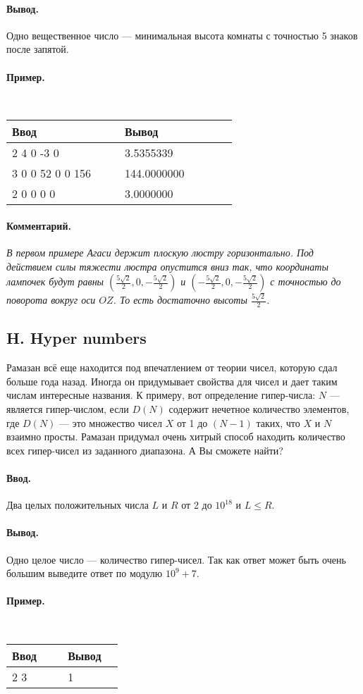 \documentclass[12pt, a4paper]{article}
\newcommand{\informat}[1]
{
	\paragraph{Ввод.\\} #1
}
\newcommand{\outformat}[1]
{
	\paragraph{Вывод.\\} #1
}
\newcommand{\example}[2]
{
	\paragraph{Пример.\\}
	{\tt
	\begin{tabular}{|p{0.4\linewidth}|p{0.4\linewidth}|}
	\hline
	Ввод & Вывод \\
	\hline
	#1 & #2		\\
	\hline
	\end{tabular}
	}
}
\newcommand{\exampleee}[6]
{
	\paragraph{Пример.\\}
	{\tt
	\begin{tabular}{|p{0.4\linewidth}|p{0.4\linewidth}|}
	\hline
	Ввод 	& Вывод  	\\
	\hline
	#1 		& #2 		\\
	\hline
	#3		& #4		\\
	\hline
	#5		& #6		\\
	\hline
	\end{tabular}
	}
}
\newcommand{\excomm}[1]
{
	\paragraph{Комментарий. \\}
	\textit{#1}
}
\begin{document}
\outformat{Одно вещественное число --- минимальная высота комнаты с точностью 5 знаков после запятой.}

\exampleee{
2 \newline
3 4 0 \newline
4 -3 0
}
{3.5355339}
{3 \newline
39 0 0 \newline
0 52 0 \newline
0 0 156
}
{144.0000000}
{2 \newline
1 0 0 \newline
-2 0 0
}
{3.0000000}

\excomm{В первом примере Агаси держит плоскую люстру горизонтально. Под действием силы тяжести люстра опустится вниз так, что координаты лампочек будут равны $\left(\frac{5 \sqrt{2}}{2}, 0, -\frac{5 \sqrt{2}}{2} \right)$ и $\left(-\frac{5 \sqrt{2}}{2}, 0, -\frac{5 \sqrt{2}}{2} \right)$ с точностью до поворота вокруг оси $OZ$. То есть достаточно высоты $\frac{5 \sqrt{2}}{2}$.}






\subsection*{H. Hyper numbers}
 

Рамазан всё еще находится под впечатлением от теории чисел, которую сдал больше года назад. Иногда он придумывает свойства для чисел и дает таким числам интересные названия. К примеру, вот определение гипер-числа: $N$ --- является гипер-числом, если $D(N)$ содержит нечетное количество элементов, где $D(N)$ --- это множество чисел $X$ от 1 до $(N-1)$ таких, что $X$ и $N$ взаимно просты. Рамазан придумал очень хитрый способ находить количество всех гипер-чисел из заданного диапазона. А Вы сможете найти?

\informat{Два целых положительных числа $L$ и $R$ от 2 до $10^{18}$ и $L \leqslant R$.}

\outformat{Одно целое число --- количество гипер-чисел. Так как ответ может быть очень большим выведите ответ по модулю $10^9+7$.}

\example{2 3}{1}
\end{document}
